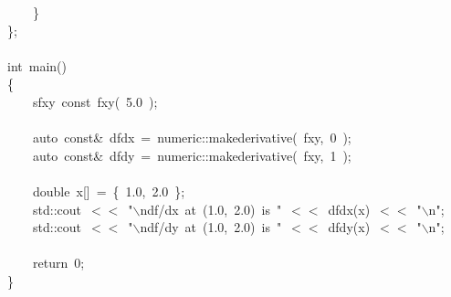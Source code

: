 \documentclass[9pt,onside]{article}
\newcommand{\hlstd}[1]{\textcolor[rgb]{0.2,0,0.4}{#1}}
\newcommand{\hlnum}[1]{\textcolor[rgb]{0.2,0.73,0.02}{#1}}
\newcommand{\hlesc}[1]{\textcolor[rgb]{0.65,0.09,0.38}{#1}}
\newcommand{\hlstr}[1]{\textcolor[rgb]{0.09,0.38,0.65}{#1}}
\newcommand{\hlopt}[1]{\textcolor[rgb]{0.33,0.33,0.33}{#1}}
\newcommand{\hlkwa}[1]{\textcolor[rgb]{1,0.19,0.19}{#1}}
\newcommand{\hlkwb}[1]{\textcolor[rgb]{0.96,0.55,0.14}{#1}}
\newcommand{\hlkwc}[1]{\textcolor[rgb]{0,0,1}{#1}}
\newcommand{\hlkwd}[1]{\textcolor[rgb]{0.82,0.11,0.93}{#1}}
\begin{document}
{\hlstd{}\hlstd{\ \ \ \ }\hlstd{}\hlopt{\}}\hspace*{\fill}\\
\hlstd{}\hlopt{\};}\hspace*{\fill}\\
\hlstd{}\hspace*{\fill}\\
\hlkwb{int\ }\hlstd{}\hlkwd{main}\hlstd{}\hlopt{()}\hspace*{\fill}\\
\hlstd{}\hlopt{\{}\hspace*{\fill}\\
\hlstd{}\hlstd{\ \ \ \ }\hlstd{sfxy\ }\hlkwb{const\ }\hlstd{}\hlkwd{fxy}\hlstd{}\hlopt{(\ }\hlstd{}\hlnum{5.0\ }\hlstd{}\hlopt{);}\hspace*{\fill}\\
\hlstd{\hspace*{\fill}\\
}\hlstd{\ \ \ \ }\hlstd{}\hlkwc{auto\ }\hlstd{}\hlkwb{const}\hlstd{}\hlopt{\&\ }\hlstd{dfdx\ }\hlopt{=\ }\hlstd{numeric}\hlopt{::}\hlstd{}\hlkwd{make\textunderscore derivative}\hlstd{}\hlopt{(\ }\hlstd{fxy}\hlopt{,\ }\hlstd{}\hlnum{0\ }\hlstd{}\hlopt{);}\hspace*{\fill}\\
\hlstd{}\hlstd{\ \ \ \ }\hlstd{}\hlkwc{auto\ }\hlstd{}\hlkwb{const}\hlstd{}\hlopt{\&\ }\hlstd{dfdy\ }\hlopt{=\ }\hlstd{numeric}\hlopt{::}\hlstd{}\hlkwd{make\textunderscore derivative}\hlstd{}\hlopt{(\ }\hlstd{fxy}\hlopt{,\ }\hlstd{}\hlnum{1\ }\hlstd{}\hlopt{);}\hspace*{\fill}\\
\hlstd{\hspace*{\fill}\\
}\hlstd{\ \ \ \ }\hlstd{}\hlkwb{double\ }\hlstd{x}\hlopt{{[}{]}\ =\ \{\ }\hlstd{}\hlnum{1.0}\hlstd{}\hlopt{,\ }\hlstd{}\hlnum{2.0\ }\hlstd{}\hlopt{\};}\hspace*{\fill}\\
\hlstd{}\hlstd{\ \ \ \ }\hlstd{std}\hlopt{::}\hlstd{cout\ }\hlopt{$<$$<$\ }\hlstd{}\hlstr{"}\hlesc{$\backslash$n}\hlstr{df/dx\ at\ (1.0,\ 2.0)\ is\ "}\hlstd{\ }\hlopt{$<$$<$\ }\hlstd{}\hlkwd{dfdx}\hlstd{}\hlopt{(}\hlstd{x}\hlopt{)\ $<$$<$\ }\hlstd{}\hlstr{"}\hlesc{$\backslash$n}\hlstr{"}\hlstd{}\hlopt{;}\hspace*{\fill}\\
\hlstd{}\hlstd{\ \ \ \ }\hlstd{std}\hlopt{::}\hlstd{cout\ }\hlopt{$<$$<$\ }\hlstd{}\hlstr{"}\hlesc{$\backslash$n}\hlstr{df/dy\ at\ (1.0,\ 2.0)\ is\ "}\hlstd{\ }\hlopt{$<$$<$\ }\hlstd{}\hlkwd{dfdy}\hlstd{}\hlopt{(}\hlstd{x}\hlopt{)\ $<$$<$\ }\hlstd{}\hlstr{"}\hlesc{$\backslash$n}\hlstr{"}\hlstd{}\hlopt{;}\hspace*{\fill}\\
\hlstd{\hspace*{\fill}\\
}\hlstd{\ \ \ \ }\hlstd{}\hlkwa{return\ }\hlstd{}\hlnum{0}\hlstd{}\hlopt{;}\hspace*{\fill}\\
\hlstd{}\hlopt{\}}\hspace*{\fill}\\
\hlstd{}\hspace*{\fill}\\
\mbox{}
}
\end{document}
